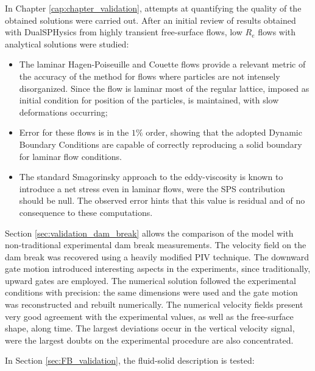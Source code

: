 In Chapter \ref{cap:chapter_validation}, attempts at quantifying the quality of the obtained solutions were carried out. After an initial review of results obtained with DualSPHysics from highly transient free-surface flows, low $R_e$ flows with analytical solutions were studied:

\begin{itemize}
\item The laminar Hagen-Poiseuille and Couette flows provide a relevant metric of the accuracy of the method for flows where particles are not intensely disorganized. Since the flow is laminar most of the regular lattice, imposed as initial condition for position of the particles, is maintained, with slow deformations occurring;
\item Error for these flows is in the $1\%$ order, showing that the adopted Dynamic Boundary Conditions are capable of correctly reproducing a solid boundary for laminar flow conditions.
\item The standard Smagorinsky approach to the eddy-viscosity is known to introduce a net stress even in laminar flows, were the \ac{SPS} contribution should be null. The observed error hints that this value is residual and of no consequence to these computations.
\end{itemize}

Section \ref{sec:validation_dam_break} allows the comparison of the model with non-traditional experimental dam break measurements. The velocity field on the dam break was recovered using a heavily modified \ac{PIV} technique. The downward gate motion introduced interesting aspects in the experiments, since traditionally, upward gates are employed. The numerical solution followed the experimental conditions with precision: the same dimensions were used and the gate motion was reconstructed and rebuilt numerically. The numerical velocity fields present very good agreement with the experimental values, as well as the free-surface shape, along time. The largest deviations occur in the vertical velocity signal, were the largest doubts on the experimental procedure are also concentrated.

In Section \ref{sec:FB_validation}, the fluid-solid description is tested:

